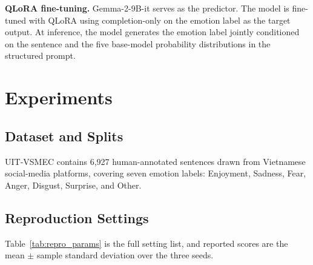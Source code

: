 \documentclass[conference]{IEEEtran}
\begin{document}
\textbf{QLoRA fine-tuning.}
Gemma-2-9B-it \cite{gemma_2024} serves as the predictor. The model is
fine-tuned with QLoRA \cite{dettmers2023qlora} using completion-only on the emotion label as the target output. At inference, the
model generates the emotion label jointly conditioned on the
sentence and the five base-model probability distributions in
the structured prompt.

\section{Experiments}

\subsection{Dataset and Splits}

UIT-VSMEC \cite{ho2020emotion} contains 6,927 human-annotated sentences drawn from
Vietnamese social-media platforms, covering seven emotion labels: Enjoyment, Sadness,
Fear, Anger, Disgust, Surprise, and Other.

\subsection{Reproduction Settings}

Table~\ref{tab:repro_params} is the full setting list, and reported scores are the mean $\pm$ sample standard deviation over the three seeds.
\end{document}
